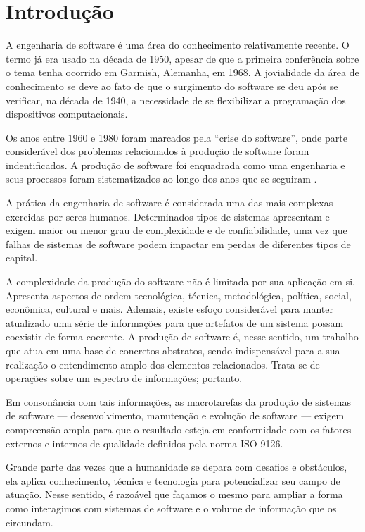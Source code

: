 
\section{Introdução}

\lettrine{A}{} engenharia de software é uma área do conhecimento relativamente
recente. O termo já era usado na década de 1950, apesar de que a primeira
conferência sobre o tema tenha ocorrido em Garmish, Alemanha, em 1968. A
jovialidade da área de conhecimento se deve ao fato de que o surgimento do
software se deu após se verificar, na década de 1940, a necessidade de se
flexibilizar a programação dos dispositivos computacionais\cite{Wazlawick2013}.

Os anos entre 1960 e 1980 foram marcados pela ``crise do software'', onde parte
considerável dos problemas relacionados à produção de software foram
indentificados. A produção de software foi enquadrada como uma engenharia e seus
processos foram sistematizados ao longo dos anos que se seguiram
\cite{Wazlawick2013}.

A prática da engenharia de software é considerada uma das mais complexas
exercidas por seres humanos\cite{Crockford2008}. Determinados tipos de sistemas
apresentam e exigem maior ou menor grau de complexidade e de confiabilidade, uma
vez que falhas de sistemas de software podem impactar em perdas de diferentes
tipos de capital.

A complexidade da produção do software não é limitada por sua aplicação em si.
Apresenta aspectos de ordem tecnológica, técnica, metodológica, política,
social, econômica, cultural e mais. Ademais, existe esfoço considerável para
manter atualizado uma série de informações para que artefatos de um sistema
possam coexistir de forma coerente. A produção de software é, nesse sentido,
um trabalho que atua em uma base de concretos abstratos, sendo indispensável
para a sua realização o entendimento amplo dos elementos relacionados. Trata-se
de operações sobre um espectro de informações; portanto.

Em consonância com tais informações, as macrotarefas da produção de sistemas de
software --- desenvolvimento, manutenção e evolução de software --- exigem
compreensão ampla para que o resultado esteja em conformidade com os fatores
externos e internos de qualidade definidos pela norma ISO 9126\cite{ISOIEC9126}.

Grande parte das vezes que a humanidade se depara com desafios e obstáculos,
ela aplica conhecimento, técnica e tecnologia para potencializar seu campo de
atuação. Nesse sentido, é razoável que façamos o mesmo para ampliar a forma como
interagimos com sistemas de software e o volume de informação que os circundam.
